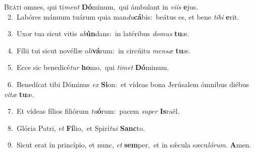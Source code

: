 \lettrine{\initial\textcolor{\initialcolor}{B}}{eáti} omnes, qui ti\textit{ment} \textbf{Dó}\-minum,~\star qui ámbulant in \textit{vi}\-\textit{is} \textbf{e}\-jus.\\
{\numbfont\textcolor{\numbcolor}{~2.}}~Labóres mánuum tuárum quia man\-\textit{du}\-\textbf{cá}bis:~\star beátus es, et bene \textit{ti}\-\textit{bi} \textbf{e}\-rit.\par
{\numbfont\textcolor{\numbcolor}{~3.}}~Uxor tua sicut vitis \textit{ab}\-\textbf{ún}dans:~\star in latéribus \textit{do}\-\textit{mus} \textbf{tu}\-æ.\par
{\numbfont\textcolor{\numbcolor}{~4.}}~Fílii tui sicut novéllæ o\-\textit{li}\-\textbf{vá}rum:~\star in circúitu \textit{men}\-\textit{sæ} \textbf{tu}\-æ.\par
{\numbfont\textcolor{\numbcolor}{~5.}}~Ecce sic benedicé\textit{tur} \textbf{ho}\-mo,~\star qui \textit{ti}\-\textit{met} \textbf{Dó}\-minum.\par
{\numbfont\textcolor{\numbcolor}{~6.}}~Benedícat tibi Dóminus \textit{ex} \textbf{Si}\-on:~\star et vídeas bona Jerúsalem ómnibus diébus \textit{vi}\-\textit{tæ} \textbf{tu}\-æ.\par
{\numbfont\textcolor{\numbcolor}{~7.}}~Et vídeas fílios filiórum \textit{tu}\-\textbf{ó}rum:~\star pacem \textit{su}\-\textit{per} \textbf{Is}\-raël.\par
{\numbfont\textcolor{\numbcolor}{~8.}}~Glória Patri, \textit{et} \textbf{Fí}\-lio,~\star et Spirí\-\textit{tu}\-\textit{i} \textbf{Sanc}\-to.\par
{\numbfont\textcolor{\numbcolor}{~9.}}~Sicut erat in princípio, et nunc, \textit{et} \textbf{sem}\-per,~\star et in sǽcula sæcu\-\textit{ló}\-\textit{rum}. \textbf{A}\-men.\par
